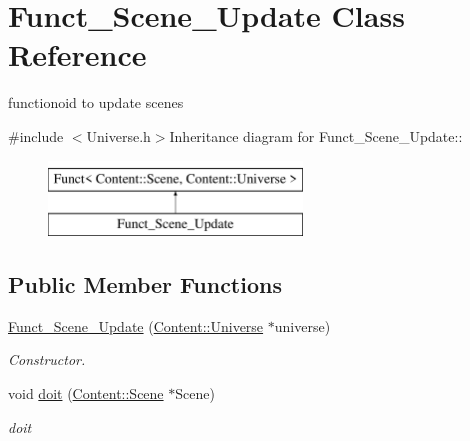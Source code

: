 \hypertarget{classFunct__Scene__Update}{
\section{Funct\_\-Scene\_\-Update Class Reference}
\label{classFunct__Scene__Update}
}


functionoid to update scenes  


{\ttfamily \#include $<$Universe.h$>$}Inheritance diagram for Funct\_\-Scene\_\-Update::\begin{figure}[H]
\begin{center}
\leavevmode
\includegraphics[height=2cm]{classFunct__Scene__Update}
\end{center}
\end{figure}
\subsection*{Public Member Functions}
\begin{DoxyCompactItemize}
\item 
\hypertarget{classFunct__Scene__Update_abb69c64f545d1dd30077d3574e6dc8ab}{
\hyperlink{classFunct__Scene__Update_abb69c64f545d1dd30077d3574e6dc8ab}{Funct\_\-Scene\_\-Update} (\hyperlink{classContent_1_1Universe}{Content::Universe} $\ast$universe)}
\label{classFunct__Scene__Update_abb69c64f545d1dd30077d3574e6dc8ab}

\begin{DoxyCompactList}\small\item\em Constructor. \item\end{DoxyCompactList}\item 
\hypertarget{classFunct__Scene__Update_a64c8b76afb2e765bf27c360c1768a549}{
void \hyperlink{classFunct__Scene__Update_a64c8b76afb2e765bf27c360c1768a549}{doit} (\hyperlink{classContent_1_1Scene}{Content::Scene} $\ast$Scene)}
\label{classFunct__Scene__Update_a64c8b76afb2e765bf27c360c1768a549}

\begin{DoxyCompactList}\small\item\em doit \item\end{DoxyCompactList}\end{DoxyCompactItemize}


